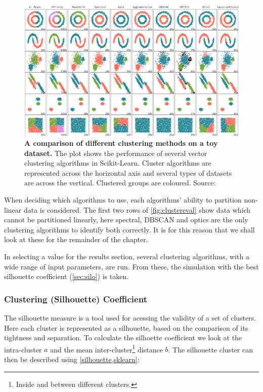 \begin{figure}[H]
     \centering

         \includegraphics[width=\textwidth]{4fig/clustereval.png}

        \caption{\textbf{A comparison of different clustering methods on a toy dataset.} The plot shows the performance of several vector clustering algorithms in Scikit-Learn. Cluster algorithms are represented across the horizontal axis and several types of datasets are across the vertical. Clustered groups are coloured. Source: \cite{clustereval}}
        \label{fig:clustereval}
\end{figure}


When deciding which algorithms to use, each algorithms' ability to partition non-linear data is considered.
The first two rows of \autoref{fig:clustereval} show data which cannot be partitioned linearly, here spectral, DBSCAN and optics are the only clustering algorithms to identify both correctly. It is for this reason that we shall look at these for the remainder of the chapter.

In selecting a value for the results section, several clustering algorithms, with a wide range of input parameters, are run. From these, the simulation with the best silhouette coefficient (\autoref{sec:silo}) is taken.




\subsubsection{Clustering (Silhouette) Coefficient}\label{sec:silo}
The silhouette measure is a tool used for acessing the validity of a set of clusters. Here each cluster is represented as a silhouette, based on the comparison of its tightness and separation. To calculate the silhoette coefficient we look at the intra-cluster $a$ and the mean inter-cluster\footnote{Inside and between different clusters.} distance $b$. The silhouette cluster can then be described using \ref{silhouette,sklearn}:


